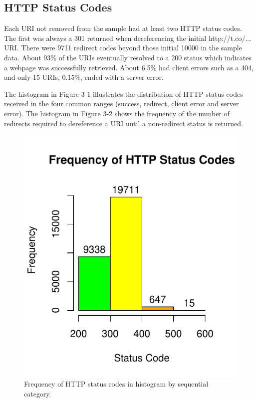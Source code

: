 \documentclass[a4paper,12pt]{article}
\begin{document}
\subsection{HTTP Status Codes}
Each URI not removed from the sample had at least two HTTP status codes. The first was always a 301
returned when dereferencing the initial http://t.co/... URI. There were 9711 redirect codes beyond
those initial 10000 in the sample data. About 93\% of the URIs eventually resolved to a 200 status
which indicates a webpage was successfully retrieved. About 6.5\% had client errors such as a 404,
and only 15 URIs, 0.15\%, ended with a server error.

The histogram in Figure 3-1 illustrates the
distribution of HTTP status codes received in the four common ranges (success, redirect, client error
and server error). The histogram in Figure 3-2 shows the frequency of the number of redirects
required to dereference a URI until a non-redirect status is returned.
\begin{figure}[H]
    \centering
    \includegraphics{stats/http_status_codes.pdf}
    \caption{Frequency of HTTP status codes in histogram by sequential category.}
\end{figure}
\end{document}
